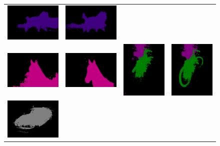 \begin{figure}[H]
{\begin{minipage}{0.98\linewidth}
\begin{tabular}{c c c c}
        \includegraphics[width=0.18\linewidth, height=0.18\linewidth]{figures/ablation/withoutrfm/2011_002398_[11]} &
        \includegraphics[width=0.18\linewidth, height=0.18\linewidth]{figures/ablation/withrfm/2011_002398_[11]} \\
        [1mm]
        \includegraphics[width=0.18\linewidth, height=0.18\linewidth]{figures/ablation/withoutrfm/2007_009807_[12]} &
        \includegraphics[width=0.18\linewidth, height=0.18\linewidth]{figures/ablation/withrfm/2007_009807_[12]} & \hspace{2pt}
        \includegraphics[width=0.18\linewidth, height=0.18\linewidth]{figures/ablation/withoutrfm/2010_003912_[1, 4]} &
        \includegraphics[width=0.18\linewidth, height=0.18\linewidth]{figures/ablation/withrfm/2010_003912_[1, 4]} \\
        [1mm]
        \includegraphics[width=0.18\linewidth, height=0.18\linewidth]{figures/ablation/withoutrfm/2010_003276_[6]} &

\end{tabular}
\end{minipage}}
\end{figure}
